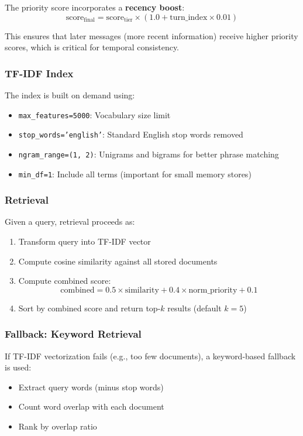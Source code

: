 \documentclass[11pt,a4paper]{article}
\begin{document}
The priority score incorporates a \textbf{recency boost}:
\[
\text{score}_{\text{final}} = \text{score}_{\text{tier}} \times (1.0 + \text{turn\_index} \times 0.01)
\]

This ensures that later messages (more recent information) receive higher priority scores, which is critical for temporal consistency.

\subsubsection{TF-IDF Index}
The index is built on demand using:
\begin{itemize}
    \item \texttt{max\_features=5000}: Vocabulary size limit
    \item \texttt{stop\_words='english'}: Standard English stop words removed
    \item \texttt{ngram\_range=(1, 2)}: Unigrams and bigrams for better phrase matching
    \item \texttt{min\_df=1}: Include all terms (important for small memory stores)
\end{itemize}

\subsubsection{Retrieval}
Given a query, retrieval proceeds as:
\begin{enumerate}
    \item Transform query into TF-IDF vector
    \item Compute cosine similarity against all stored documents
    \item Compute combined score: \[
        \text{combined} = 0.5 \times \text{similarity} + 0.4 \times \text{norm\_priority} + 0.1
    \]
    \item Sort by combined score and return top-$k$ results (default $k=5$)
\end{enumerate}

\subsubsection{Fallback: Keyword Retrieval}
If TF-IDF vectorization fails (e.g., too few documents), a keyword-based fallback is used:
\begin{itemize}
    \item Extract query words (minus stop words)
    \item Count word overlap with each document
    \item Rank by overlap ratio
\end{itemize}
\end{document}
